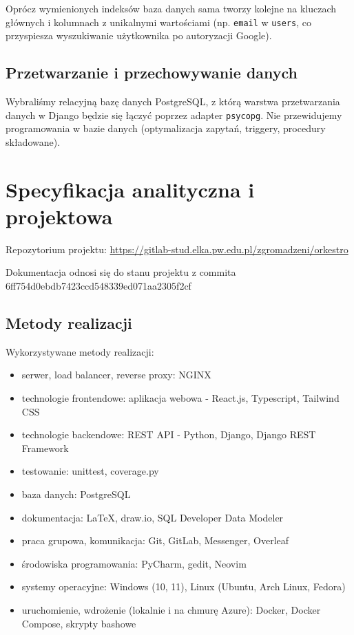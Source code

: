 \documentclass[11pt,a4paper]{article}
\renewcommand{\_}{\char`_}
\begin{document}
Oprócz wymienionych indeksów baza danych sama tworzy kolejne na kluczach głównych i kolumnach z unikalnymi wartościami (np. \texttt{email} w \texttt{users}, co przyspiesza wyszukiwanie użytkownika po autoryzacji Google).

\subsection{Przetwarzanie i przechowywanie danych}

Wybraliśmy relacyjną bazę danych PostgreSQL, z którą warstwa przetwarzania danych w Django będzie się łączyć poprzez adapter \texttt{psycopg}. Nie przewidujemy programowania w bazie danych (optymalizacja zapytań, triggery, procedury składowane).

\section{Specyfikacja analityczna i projektowa}

Repozytorium projektu: \href{https://gitlab-stud.elka.pw.edu.pl/zgromadzeni/orkestro}{https://gitlab-stud.elka.pw.edu.pl/zgromadzeni/orkestro}

Dokumentacja odnosi się do stanu projektu z commita 6ff754d0ebdb7423ccd548339ed071aa2305f2cf

\subsection{Metody realizacji}

Wykorzystywane metody realizacji:
\begin{itemize}
    \item serwer, load balancer, reverse proxy: NGINX
    \item technologie frontendowe: aplikacja webowa - React.js, Typescript, Tailwind CSS
    \item technologie backendowe: REST API - Python, Django, Django REST Framework
    \item testowanie: unittest, coverage.py
    \item baza danych: PostgreSQL
    \item dokumentacja: LaTeX, draw.io, SQL Developer Data Modeler
    \item praca grupowa, komunikacja: Git, GitLab, Messenger, Overleaf
    \item środowiska programowania: PyCharm, gedit, Neovim
    \item systemy operacyjne: Windows (10, 11), Linux (Ubuntu, Arch Linux, Fedora)
    \item uruchomienie, wdrożenie (lokalnie i na chmurę Azure): Docker, Docker Compose, skrypty bashowe
\end{itemize}
\end{document}
